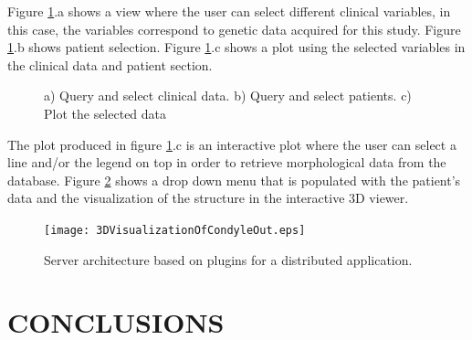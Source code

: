 \documentclass[]{spie}  %
\begin{document}
Figure \ref{fig:queryAndSelect}.a shows a view where the user can select different clinical variables, in this case, the variables correspond to genetic data
acquired for this study. Figure \ref{fig:queryAndSelect}.b shows patient selection. Figure \ref{fig:queryAndSelect}.c shows a plot using the selected 
variables in the clinical data and patient section. 

\begin{figure}
	\centering 
	\caption[Import and generate clinical data]{a) Query and select clinical data. b) Query and select patients. c) Plot the selected data}
	\label{fig:queryAndSelect}
\end{figure} 

The plot produced in figure \ref{fig:queryAndSelect}.c is an interactive plot where the user can select a line and/or the legend on top 
in order to retrieve morphological data from the database. Figure \ref{fig:3DVisualizationOfCondyle} shows a drop down menu that is populated 
with the patient's data and the visualization of the structure in the interactive 3D viewer.

\begin{figure}
	\centering 
	\texttt{[image: 3DVisualizationOfCondyleOut.eps]}
	\caption[Server architecture]{Server architecture based on plugins for a distributed application.}
	\label{fig:3DVisualizationOfCondyle}
\end{figure}

\section{CONCLUSIONS} 
\end{document}
